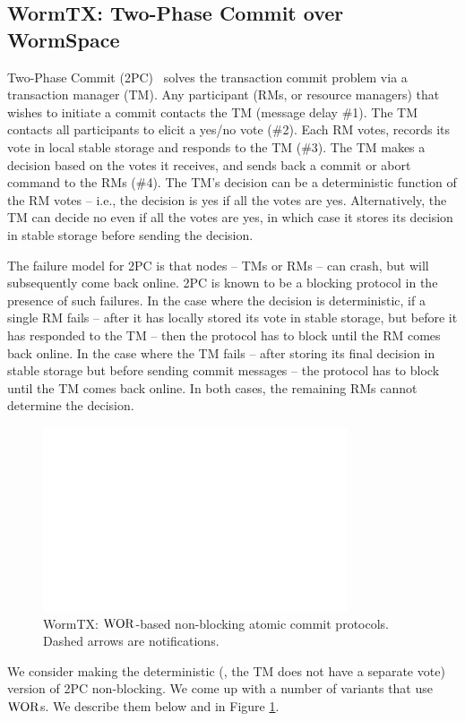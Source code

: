 \subsection{WormTX: Two-Phase Commit over WormSpace}
\label{chapter:wormspace:subsec:wormtx}

Two-Phase Commit (2PC)~\cite{distsys} solves the transaction commit problem via a transaction manager (TM). 
Any participant (RMs, or resource managers) that wishes to initiate a commit contacts the TM (message delay \#1). 
The TM contacts all participants to elicit a yes/no vote (\#2). Each RM votes, records its vote in local stable storage and responds to the TM (\#3). 
The TM makes a decision based on the votes it receives, and sends back a commit or abort command to the RMs (\#4). 
The TM's decision can be a deterministic function of the RM votes -- i.e., the decision is yes if all the votes are yes. 
Alternatively, the TM can decide no even if all the votes are yes, in which case it stores its decision in stable storage before sending the decision.

The failure model for 2PC is that nodes -- TMs or RMs -- can crash, but will subsequently come back online. 
2PC is known to be a blocking protocol in the presence of such failures. In the case where the decision is deterministic, 
if a single RM fails -- after it has locally stored its vote in stable storage, but before it has responded to the 
TM -- then the protocol has to block until the RM comes back online. In the case where the TM fails --
 after storing its final decision in stable storage but before sending commit messages -- 
 the protocol has to block until the TM comes back online. In both cases, the remaining RMs cannot determine the decision. 
\begin{figure}
\centering
\includegraphics[width=0.8\textwidth, page=5]{figs/multipaxos/pics-longer}
\caption{WormTX: $\mathrm{WOR}$-based non-blocking atomic commit protocols. Dashed arrows are notifications.}
\label{fig:chapter:multipaxos:commit}
\end{figure}
We consider making the deterministic (\ie, the TM does not have a separate vote) version of 2PC non-blocking. 
We come up with a number of variants that use $\mathrm{WOR}$s. We describe them below and in Figure \ref{fig:chapter:multipaxos:commit}.

